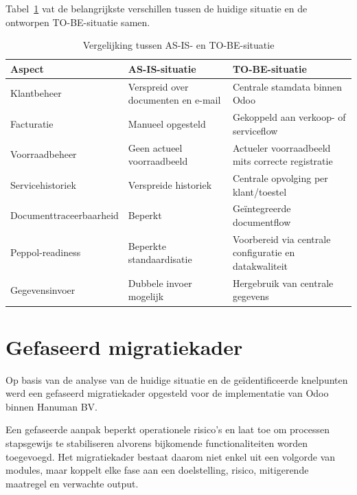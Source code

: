 Tabel~\ref{tab:asis-tobe-overzicht} vat de belangrijkste verschillen tussen de huidige situatie en de ontworpen TO-BE-situatie samen.

\begin{table}[H]
\centering
\caption{Vergelijking tussen AS-IS- en TO-BE-situatie}
\label{tab:asis-tobe-overzicht}
\begin{tabular}{|p{4cm}|p{5cm}|p{5cm}|}
\hline
\textbf{Aspect} & \textbf{AS-IS-situatie} & \textbf{TO-BE-situatie} \\
\hline
Klantbeheer & Verspreid over documenten en e-mail & Centrale stamdata binnen Odoo \\
\hline
Facturatie & Manueel opgesteld & Gekoppeld aan verkoop- of serviceflow \\
\hline
Voorraadbeheer & Geen actueel voorraadbeeld & Actueler voorraadbeeld mits correcte registratie \\
\hline
Servicehistoriek & Verspreide historiek & Centrale opvolging per klant/toestel \\
\hline
Documenttraceerbaarheid & Beperkt & Geïntegreerde documentflow \\
\hline
Peppol-readiness & Beperkte standaardisatie & Voorbereid via centrale configuratie en datakwaliteit \\
\hline
Gegevensinvoer & Dubbele invoer mogelijk & Hergebruik van centrale gegevens \\
\hline
\end{tabular}
\end{table}

\section{Gefaseerd migratiekader}
\label{sec:migratiekader}

Op basis van de analyse van de huidige situatie en de geïdentificeerde knelpunten werd een gefaseerd migratiekader opgesteld voor de implementatie van Odoo binnen Hanuman BV.

Een gefaseerde aanpak beperkt operationele risico’s en laat toe om processen stapsgewijs te stabiliseren alvorens bijkomende functionaliteiten worden toegevoegd. Het migratiekader bestaat daarom niet enkel uit een volgorde van modules, maar koppelt elke fase aan een doelstelling, risico, mitigerende maatregel en verwachte output.

